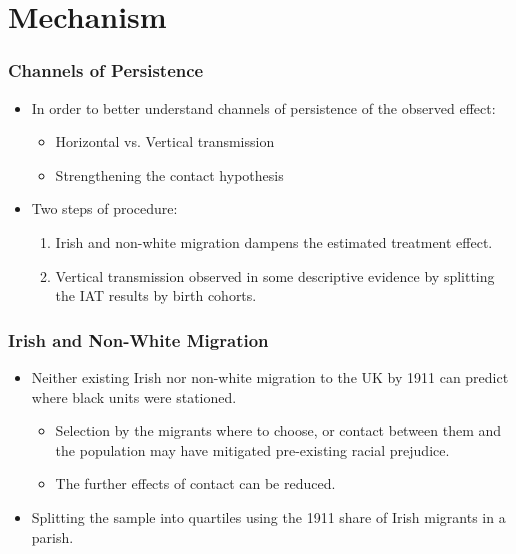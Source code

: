 \documentclass[dvipdfmx,11pt]{beamer}
\begin{document}
\section{Mechanism}
\frame{\sectionpage}
\begin{frame}\frametitle{Channels of Persistence}
  \begin{itemize}
    \item In order to better understand channels of persistence of the observed effect:
    \begin{itemize}
      \item Horizontal vs. Vertical  transmission
      \item Strengthening the contact hypothesis
    \end{itemize}
    \item Two steps of procedure:
    \begin{enumerate}
      \item Irish and non-white migration dampens the estimated treatment effect.
      \item Vertical transmission observed in some descriptive evidence by splitting the IAT results by birth cohorts.
    \end{enumerate}
  \end{itemize}
\end{frame}

\begin{frame}\frametitle{Irish and Non-White Migration}
  \begin{itemize}
    \item Neither existing Irish nor non-white migration to the UK by 1911 can predict where black units were stationed.
    \begin{itemize}
      \item Selection by the migrants where to choose, or contact between them and the population may have mitigated pre-existing racial prejudice.
      \item The further effects of contact can be reduced.
    \end{itemize}
    \item Splitting the sample into quartiles using the 1911 share of Irish migrants in a parish.
  \end{itemize}
\end{frame}
\end{document}
